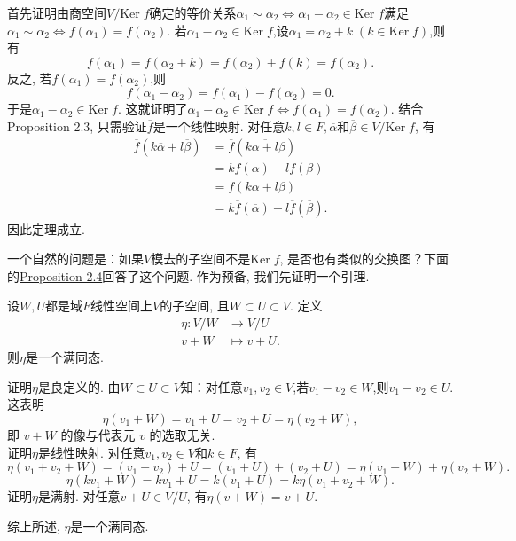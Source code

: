 \documentclass[color=green,mathpazo,titlestyle=hang]{elegantbook}
\begin{document}
\newpage
\begin{newproof}
	首先证明由商空间$V/\mathrm{Ker}\;f$确定的等价关系$\alpha_1\sim\alpha_2\iff\alpha_1-\alpha_2\in\mathrm{Ker}\;f$满足$\alpha_1\sim\alpha_2\iff f(\alpha_1) = f(\alpha_2)$. 若$\alpha_1-\alpha_2\in\mathrm{Ker}\;f$,设$\alpha_1=\alpha_2+k\;(k\in\mathrm{Ker}\;f)$,则有\[f(\alpha_1) =f(\alpha_2+k)=f(\alpha_2)+f(k)=f(\alpha_2).\]
	反之, 若$f(\alpha_1) = f(\alpha_2)$,则\[f(\alpha_1-\alpha_2)=f(\alpha_1)-f(\alpha_2)=0.\]
	于是$\alpha_1-\alpha_2\in\mathrm{Ker}\;f$. 这就证明了$\alpha_1-\alpha_2\in\mathrm{Ker}\;f\iff f(\alpha_1) = f(\alpha_2).$
	结合Proposition 2.3, 只需验证$\overline{f}$是一个线性映射. 对任意$k,l\in F,\overline{\alpha}$和$\overline{\beta}\in V/\mathrm{Ker}\;f$, 有
	\[
	\begin{aligned}
	\overline{f}(k\overline{\alpha}+l\overline{\beta})
	&=\overline{f}(\overline{k\alpha+l\beta})\\
	&=kf(\alpha)+lf(\beta)\\
	&=f(k\alpha+l\beta)\\
	&=k\overline{f}(\overline{\alpha})+l\overline{f}(\overline{\beta}).
	\end{aligned}
	\]
	因此定理成立.
	
\end{newproof}
\par

一个自然的问题是：如果$V$模去的子空间不是$\mathrm{Ker}\;f$, 是否也有类似的交换图？下面的\hyperlink{Proposition 2.4}{Proposition 2.4}回答了这个问题. 作为预备, 我们先证明一个引理.    

\begin{newlemma}\hypertarget{Lemma 2.1}{}
	设$W,U$都是域$F$线性空间上$V$的子空间, 且$W\subset U\subset V$. 定义
	\[
	\begin{aligned}
	\eta:V/W&\longrightarrow V/U\\
         v+W&\longmapsto v+U.	
	\end{aligned}
	\]
	则$\eta$是一个满同态.
\end{newlemma}

\newpage

\begin{newproof}
	证明$\eta$是良定义的. 由$W\subset U\subset V$知：对任意$v_1,v_2\in V$,若$v_1-v_2\in W$,则$v_1-v_2\in U$. 这表明
	\[
	\eta(v_1+W)=v_1+U=v_2+U=\eta(v_2+W),
	\]
	即 $v+W$ 的像与代表元 $v$ 的选取无关.\\
	证明$\eta$是线性映射. 对任意$v_1,v_2\in V$和$k\in F$, 有
	\[
	\eta(v_1+v_2+W)=(v_1+v_2)+U=(v_1+U)+(v_2+U)=\eta(v_1+W)+\eta(v_2+W).
	\]
	\[
	\eta(kv_1+W)=kv_1+U=k(v_1+U)=k\eta(v_1+v_2+W).
	\]
	证明$\eta$是满射. 对任意$v+U\in V/U$, 有$\eta(v+W)=v+U$.\par
	综上所述, $\eta$是一个满同态.
	
\end{newproof}
\end{document}
